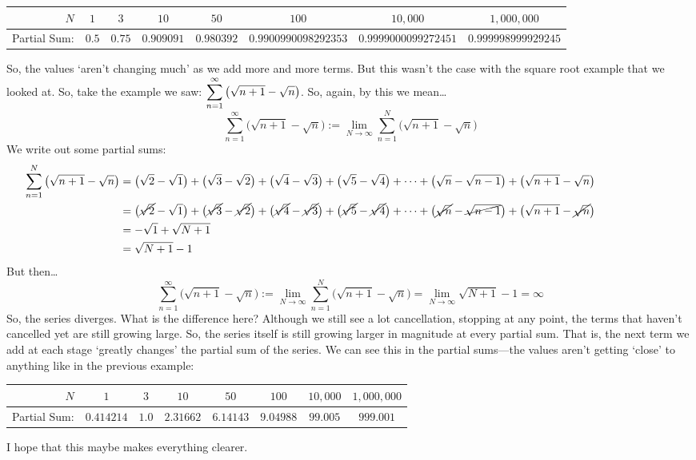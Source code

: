 \documentclass[11pt,letterpaper]{article}
\begin{document}
\begin{itemize}
\begin{table}[H]
\begin{tabular}{r||ccccccc}
	$N$ & $1$ & $3$ & $10$ & $50$ & $100$ & $10,\!000$ & $1,\!000,\!000$ \\ \hline
	Partial Sum: & $0.5$ & $0.75$ & $0.909091$ & $0.980392$ & $0.9900990098292353$ & $0.9999000099272451$ & $0.999998999929245$
	\end{tabular}
	\end{table}
So, the values `aren't changing much' as we add more and more terms. But this wasn't the case with the square root example that we looked at. So, take the example we saw: $\displaystyle\sum_{n=1}^\infty \big( \sqrt{n + 1} - \sqrt{n} \big)$. So, again, by this we mean\dots
	\[
	\sum_{n=1}^\infty \big( \sqrt{n + 1} - \sqrt{n} \big):= \lim_{N \to \infty} \sum_{n=1}^N \big( \sqrt{n + 1} - \sqrt{n} \big)
	\]
We write out some partial sums:
	\[
	\begin{aligned}
	\hspace{-2.5cm}\sum_{n=1}^N \big( \sqrt{n + 1} - \sqrt{n} \big)&= \big( \sqrt{2} - \sqrt{1} \big) + \big( \sqrt{3} - \sqrt{2} \big) + \big( \sqrt{4} - \sqrt{3} \big) + \big( \sqrt{5} - \sqrt{4} \big) + \cdots + \big( \sqrt{n} - \sqrt{n-1} \big) + \big( \sqrt{n+1} - \sqrt{n} \big) \\
	&= \big( \cancel{\sqrt{2}} - \sqrt{1} \big) + \big( \cancel{\sqrt{3}} - \cancel{\sqrt{2}} \big) + \big( \cancel{\sqrt{4}} - \cancel{\sqrt{3}} \big) + \big( \cancel{\sqrt{5}} - \cancel{\sqrt{4}} \big) + \cdots + \big( \cancel{\sqrt{n}} - \cancel{\sqrt{n-1}} \big) + \big( \sqrt{n+1} - \cancel{\sqrt{n}} \big) \\ 
	&= -\sqrt{1} + \sqrt{N + 1} \\
	&= \sqrt{N + 1} - 1
	\end{aligned}
	\]
But then\dots
	\[
	\sum_{n=1}^\infty \big( \sqrt{n + 1} - \sqrt{n} \big):= \lim_{N \to \infty} \sum_{n=1}^N \big( \sqrt{n + 1} - \sqrt{n} \big)= \lim_{N \to \infty} \sqrt{N + 1} - 1= \infty
	\]
So, the series diverges. What is the difference here? Although we still see a lot cancellation, stopping at any point, the terms that haven't cancelled yet are still growing large. So, the series itself is still growing larger in magnitude at every partial sum. That is, the next term we add at each stage `greatly changes' the partial sum of the series. We can see this in the partial sums---the values aren't getting `close' to anything like in the previous example:
	\begin{table}[H]
	\centering
	\begin{tabular}{r||ccccccc}
	$N$ & $1$ & $3$ & $10$ & $50$ & $100$ & $10,\!000$ & $1,\!000,\!000$ \\ \hline
	Partial Sum: & $0.414214$ & $1.0$ & $2.31662$ & $6.14143$ & $9.04988$ & $99.005$ & $999.001$ 
	\end{tabular}
	\end{table}
I hope that this maybe makes everything clearer. 
\end{itemize}
\end{document}
